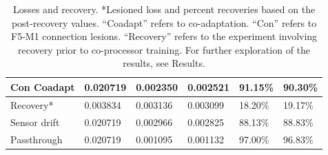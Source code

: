 \documentclass[12pt]{iopart}
\begin{document}
\begin{table}[h]
\begin{tabular}{|l|l|l|l|l|l|}
Con Coadapt    & 0.020719                                                          & 0.002350                                                         & 0.002521                                                             & 91.15\%            & 90.30\%                                                          \\ \hline
Recovery*      & 0.003834                                                          & 0.003136                                                         & 0.003099                                                             & 18.20\%            & 19.17\%                                                          \\ \hline
Sensor drift   & 0.020719                                                          & 0.002966                                                        & 0.002825                                                              & 88.13\%            & 88.83\%                                                          \\ \hline
Passthrough    & 0.020719                                                          & 0.001095                                                        & 0.001132                                                              & 97.00\%            & 96.83\%                                                          \\ \hline
\end{tabular}
\caption{\label{tab:results}Losses and recovery. *Lesioned loss and percent recoveries based on the post-recovery values.
         ``Coadapt'' refers to co-adaptation. ``Con'' refers to F5-M1 connection lesions. ``Recovery'' refers to the
         experiment involving recovery prior to co-processor training. For further exploration of the results, see Results.}
\end{table}
\end{document}
